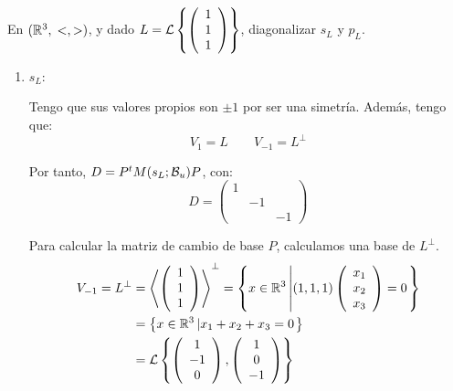 \begin{ejercicio}
    En $(\mathbb{R}^3,\;<,>)$, y dado $L=\mathcal{L}\left\{\left(\begin{array}{c}
         1 \\ 1 \\ 1
    \end{array}\right)\right\}$, diagonalizar $s_L$ y $p_L$.

    \begin{enumerate}
        \item $s_L$:

        Tengo que sus valores propios son $\pm 1$ por ser una simetría. Además, tengo que:
        \begin{equation*}
            V_1=L \qquad V_{-1}=L^\perp
        \end{equation*}

        Por tanto, $D=P^tM(s_L;\mathcal{B}_u)P$, con:
        \begin{equation*}
            D=\left(\begin{array}{ccc}
                1 &  \\
                 & -1 \\
                 && -1
            \end{array}\right)
        \end{equation*}

        Para calcular la matriz de cambio de base $P$, calculamos una base de $L^\perp$.
        \begin{equation*}\begin{split}
            V_{-1}=L^\perp &=\left<\left( \begin{array}{c}
           1 \\ 1 \\ 1
        \end{array}\right)\right>^\perp = \left\{x\in \mathbb{R}^3 \left|
            (1,1,1)
            \left( \begin{array}{c}
                x_1 \\ x_2 \\ x_3
            \end{array}\right)
            = 0
            \right.\right\}\\
            & = \left\{x\in \mathbb{R}^3 \left|
            x_1+x_2+x_3=0
            \right.\right\}\\
            &= \mathcal{L} \left\{ \left(\begin{array}{c}
                     1 \\ -1 \\ 0
                \end{array} \right),
                \left(\begin{array}{c}
                     1 \\ 0 \\ -1
                \end{array} \right)\right\}
        \end{split}\end{equation*}


\end{enumerate}
\end{ejercicio}
